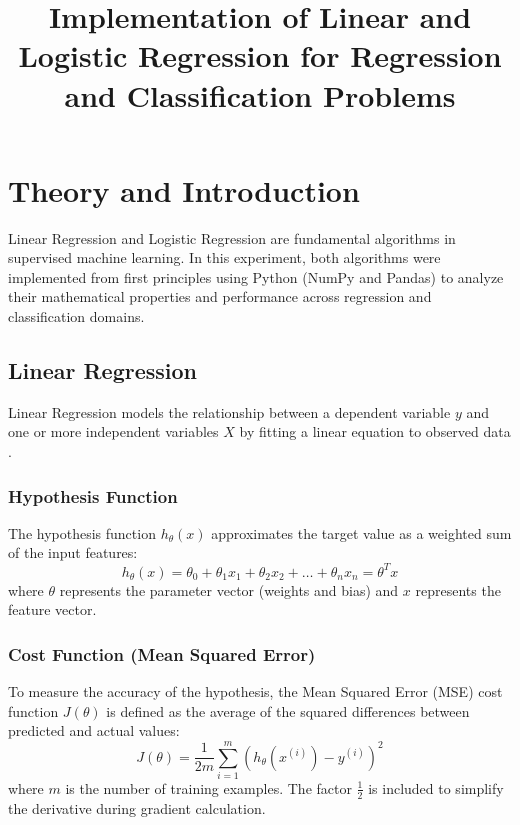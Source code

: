 \documentclass[11pt]{article}
\title{Implementation of Linear and Logistic Regression for Regression and Classification Problems}
\author{}
\date{}
\begin{document}


\pagebreak

\tableofcontents

\pagebreak
{}
\maketitle

\section{Theory and Introduction}
Linear Regression and Logistic Regression are fundamental algorithms in supervised machine learning. In this experiment, both algorithms were implemented from first principles using Python (NumPy and Pandas) to analyze their mathematical properties and performance across regression and classification domains.

\subsection{Linear Regression}
Linear Regression models the relationship between a dependent variable $y$ and one or more independent variables $X$ by fitting a linear equation to observed data \cite{bishop2006pattern}.

\subsubsection{Hypothesis Function}
The hypothesis function $h_\theta(x)$ approximates the target value as a weighted sum of the input features:
\begin{equation}
    h_\theta(x) = \theta_0 + \theta_1 x_1 + \theta_2 x_2 + \dots + \theta_n x_n = \theta^T x
\end{equation}
where $\theta$ represents the parameter vector (weights and bias) and $x$ represents the feature vector.

\subsubsection{Cost Function (Mean Squared Error)}
To measure the accuracy of the hypothesis, the Mean Squared Error (MSE) cost function $J(\theta)$ is defined as the average of the squared differences between predicted and actual values:
\begin{equation}
    J(\theta) = \frac{1}{2m} \sum_{i=1}^{m} \left( h_\theta(x^{(i)}) - y^{(i)} \right)^2
\end{equation}
where $m$ is the number of training examples. The factor $\frac{1}{2}$ is included to simplify the derivative during gradient calculation.
\end{document}
